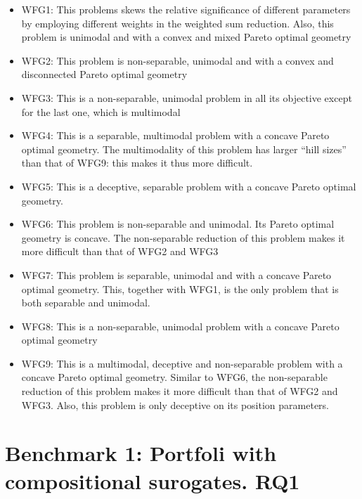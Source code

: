         \begin{itemize}
            \item WFG1: This problems skews the relative significance of different parameters by employing different weights in the weighted sum reduction. Also, this problem is unimodal and with a convex and mixed Pareto optimal geometry
            \item WFG2: This problem is non-separable, unimodal and with a convex and disconnected Pareto optimal geometry
            \item WFG3: This is a non-separable, unimodal problem in all its objective except for the last one, which is multimodal
            \item WFG4: This is a separable, multimodal problem with a concave Pareto optimal geometry. The multimodality of this problem has larger “hill sizes” than that of WFG9: this makes it thus more difficult.
            \item WFG5: This is a deceptive, separable problem with a concave Pareto optimal geometry.
            \item WFG6: This problem is non-separable and unimodal. Its Pareto optimal geometry is concave. The non-separable reduction of this problem makes it more difficult than that of WFG2 and WFG3
            \item WFG7: This problem is separable, unimodal and with a concave Pareto optimal geometry. This, together with WFG1, is the only problem that is both separable and unimodal.
            \item WFG8: This is a non-separable, unimodal problem with a concave Pareto optimal geometry
            \item WFG9: This is a multimodal, deceptive and non-separable problem with a concave Pareto optimal geometry. Similar to WFG6, the non-separable reduction of this problem makes it more difficult than that of WFG2 and WFG3. Also, this problem is only deceptive on its position parameters.
        \end{itemize}



\section{Benchmark 1: Portfoli with compositional surogates. RQ1}
